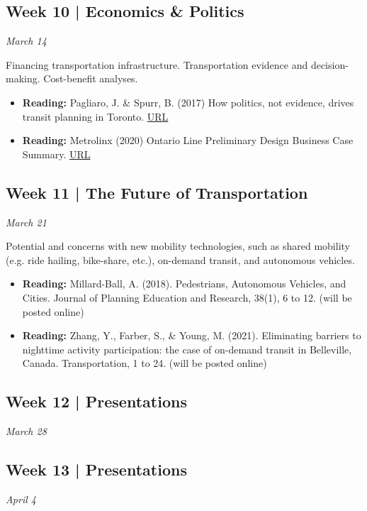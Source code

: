 \documentclass[11pt]{article}
\begin{document}
	
	
	
	
	\subsection*{Week 10 | Economics \& Politics}
	
	\textit{March 14}
	
	Financing transportation infrastructure. Transportation evidence and decision-making. Cost-benefit analyses. 
	
	\begin{itemize}
		
		\item \textbf{Reading:} Pagliaro, J. \& Spurr, B. (2017) How politics, not evidence, drives transit planning in Toronto. \href{https://www.thestar.com/news/city_hall/2017/09/18/how-politics-not-evidence-drives-transit-planning-in-toronto.html}{URL}
		
		\item \textbf{Reading:} Metrolinx (2020) Ontario Line Preliminary Design 
		Business Case Summary.
		\href{https://www.metrolinx.com/en/regionalplanning/projectevaluation/benefitscases/benefits_case_analyses.aspx}{URL}
		
		
	\end{itemize}
	
	
	
	
		
	\subsection*{Week 11 | The Future of Transportation}
	
	\textit{March 21}
	
	Potential and concerns with new mobility technologies, such as shared mobility (e.g. ride hailing, bike-share, etc.), on-demand transit, and autonomous vehicles.
	
	\begin{itemize}
		\item \textbf{Reading:} Millard-Ball, A. (2018). Pedestrians, Autonomous Vehicles, and Cities. Journal of
		Planning Education and Research, 38(1), 6 to 12. (will be posted online)
		
		\item \textbf{Reading:} Zhang, Y., Farber, S., \& Young, M. (2021). Eliminating barriers to nighttime activity participation: the case of on-demand transit in Belleville, Canada. Transportation, 1 to 24. (will be posted online)
	\end{itemize}
	
	
	
	
	
	
	\subsection*{Week 12 | Presentations}
	
	\textit{March 28}
	
	
	\subsection*{Week 13 | Presentations}

	\textit{April 4}

	
	


	
\end{document}

